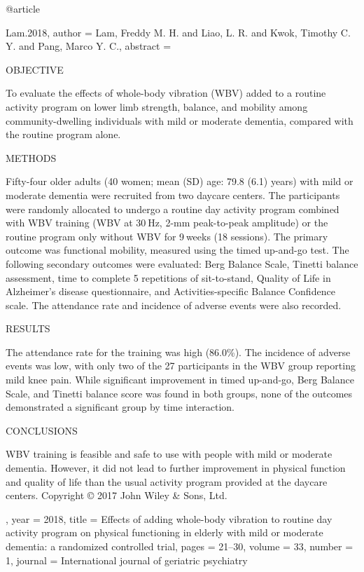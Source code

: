 @article{Lam.2018,
 author = {Lam, Freddy M. H. and Liao, L. R. and Kwok, Timothy C. Y. and Pang, Marco Y. C.},
 abstract = {OBJECTIVE

To evaluate the effects of whole-body vibration (WBV) added to a routine activity program on lower limb strength, balance, and mobility among community-dwelling individuals with mild or moderate dementia, compared with the routine program alone.

METHODS

Fifty-four older adults (40 women; mean (SD) age: 79.8 (6.1) years) with mild or moderate dementia were recruited from two daycare centers. The participants were randomly allocated to undergo a routine day activity program combined with WBV training (WBV at 30 Hz, 2-mm peak-to-peak amplitude) or the routine program only without WBV for 9 weeks (18 sessions). The primary outcome was functional mobility, measured using the timed up-and-go test. The following secondary outcomes were evaluated: Berg Balance Scale, Tinetti balance assessment, time to complete 5 repetitions of sit-to-stand, Quality of Life in Alzheimer's disease questionnaire, and Activities-specific Balance Confidence scale. The attendance rate and incidence of adverse events were also recorded.

RESULTS

The attendance rate for the training was high (86.0{\%}). The incidence of adverse events was low, with only two of the 27 participants in the WBV group reporting mild knee pain. While significant improvement in timed up-and-go, Berg Balance Scale, and Tinetti balance score was found in both groups, none of the outcomes demonstrated a significant group by time interaction.

CONCLUSIONS

WBV training is feasible and safe to use with people with mild or moderate dementia. However, it did not lead to further improvement in physical function and quality of life than the usual activity program provided at the daycare centers. Copyright {\copyright} 2017 John Wiley {\&} Sons, Ltd.},
 year = {2018},
 title = {{Effects of adding whole-body vibration to routine day activity program on physical functioning in elderly with mild or moderate dementia: a randomized controlled trial}},
 pages = {21--30},
 volume = {33},
 number = {1},
 journal = {{International journal of geriatric psychiatry}}
}


